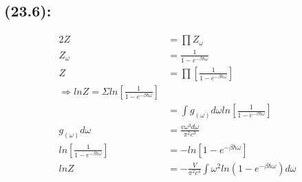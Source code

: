 \begin{latin}
    \section*{(23.6):}
    \begin{alignat*}{2}
        Z &= \prod Z_{\omega}\\
        Z_{\omega} &= \frac{1}{1- e^{-\beta \hbar \omega}}\\
        Z &= \prod[\frac{1}{1- e^{-\beta \hbar \omega}}]\\
        \Rightarrow lnZ = \Sigma ln [\frac{1}{1- e^{-\beta \hbar \omega}}]\\
        &= \int g_{(\omega)} d\omega ln[\frac{1}{1- e^{-\beta \hbar \omega}}]\\
        g_{(\omega)} d\omega &= \frac{v\omega^3 d\omega}{\pi^2 c^3}\\
        ln [\frac{1}{1- e^{-\beta \hbar \omega}}] &= - ln [1- e^{-\beta \hbar \omega}]\\
        lnZ &= -\frac{V}{\pi^2 c^3} \int \omega^2 ln (1- e^{-\beta \hbar \omega}) d\omega\\
    \end{alignat*}
\end{latin}
